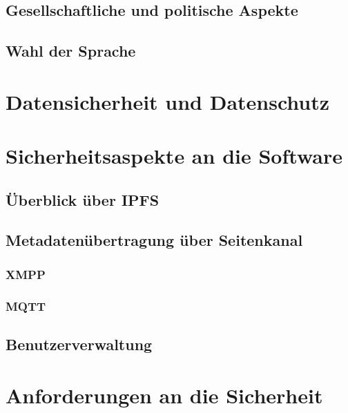 \documentclass[11pt,ngerman,toc=listof,index=totoc]{scrreprt}
\begin{document}
\section{Gesellschaftliche und politische
Aspekte}\label{gesellschaftliche-und-politische-aspekte}

\section{Wahl der Sprache}\label{wahl-der-sprache}

\chapter{Datensicherheit und
Datenschutz}\label{datensicherheit-und-datenschutz}

\chapter{Sicherheitsaspekte an die
Software}\label{sicherheitsaspekte-an-die-software}

\section{Überblick über IPFS}\label{uxfcberblick-uxfcber-ipfs}

\section{Metadatenübertragung über
Seitenkanal}\label{metadatenuxfcbertragung-uxfcber-seitenkanal}

\subsection{XMPP}\label{xmpp}

\subsection{MQTT}\label{mqtt}

\section{Benutzerverwaltung}\label{benutzerverwaltung}

\chapter{Anforderungen an die
Sicherheit}\label{anforderungen-an-die-sicherheit}
\end{document}
